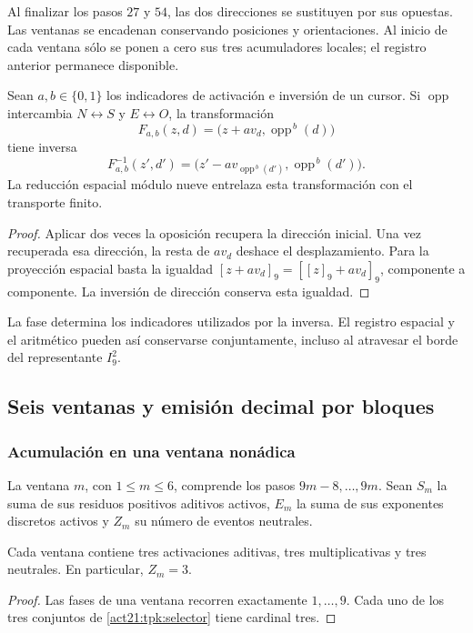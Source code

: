 Al finalizar los pasos \(27\) y \(54\), las dos direcciones se sustituyen
por sus opuestas. Las ventanas se encadenan conservando posiciones y
orientaciones. Al inicio de cada ventana sólo se ponen a cero sus tres
acumuladores locales; el registro anterior permanece disponible.

\begin{proposition}
\label{act21:tpk:inversion}
Sean \(a,b\in\{0,1\}\) los indicadores de activación e inversión de un
cursor. Si \(\operatorname{opp}\) intercambia \(N\leftrightarrow S\) y
\(E\leftrightarrow O\), la transformación
\[
 F_{a,b}(z,d)=\bigl(z+a v_d,\operatorname{opp}^{\,b}(d)\bigr)
\]
tiene inversa
\[
 F_{a,b}^{-1}(z',d')=
 \bigl(z'-a v_{\operatorname{opp}^{\,b}(d')},
       \operatorname{opp}^{\,b}(d')\bigr).
\]
La reducción espacial módulo nueve entrelaza esta transformación con el
transporte finito.
\end{proposition}
\begin{proof}
Aplicar dos veces la oposición recupera la dirección inicial. Una vez
recuperada esa dirección, la resta de \(a v_d\) deshace el desplazamiento.
Para la proyección espacial basta la igualdad
\([z+a v_d]_9=[[z]_9+a v_d]_9\), componente a componente. La inversión de
dirección conserva esta igualdad.
\end{proof}

La fase determina los indicadores utilizados por la inversa. El registro
espacial y el aritmético pueden así conservarse conjuntamente, incluso al
atravesar el borde del representante \(I_9^2\).

\subsection{Seis ventanas y emisión decimal por bloques}
\label{act21:tpk:emision}

\subsubsection{Acumulación en una ventana nonádica}

La ventana \(m\), con \(1\leq m\leq6\), comprende los pasos
\(9m-8,\ldots,9m\). Sean \(S_m\) la suma de sus residuos positivos
aditivos activos, \(E_m\) la suma de sus exponentes discretos activos y
\(Z_m\) su número de eventos neutrales.

\begin{lemma}
\label{act21:tpk:tres-eventos}
Cada ventana contiene tres activaciones aditivas, tres multiplicativas y
tres neutrales. En particular, \(Z_m=3\).
\end{lemma}
\begin{proof}
Las fases de una ventana recorren exactamente \(1,\ldots,9\). Cada uno
de los tres conjuntos de \eqref{act21:tpk:selector} tiene cardinal tres.
\end{proof}

